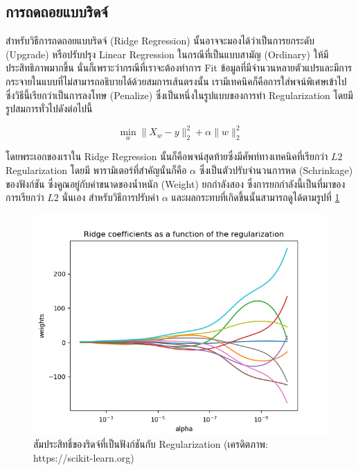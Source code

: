 \subsection{การถดถอยแบบริดจ์}
\label{ssec:ridge_reg}

สำหรับวิธีการถดถอยแบบริดจ์ (Ridge Regression) นั้นอาจจะมองได้ว่าเป็นการยกระดับ (Upgrade) หรือปรับปรุง Linear Regression 
ในกรณีที่เป็นแบบสามัญ (Ordinary) ให้มีประสิทธิภาพมากขึ้น นั่นก็เพราะว่ากรณีที่เราจะต้องทำการ Fit ข้อมูลที่มีจำนวนหลายตัวแปรและมีการ%
กระจายในแบบที่ไม่สามารถอธิบายได้ด้วยสมการเส้นตรงนั้น เรามีเทคนิคก็คือการใส่พจน์พิเศษเข้าไป ซึ่งวิธีนี้เรียกว่าเป็นการลงโทษ (Penalize) 
ซึ่งเป็นหนึ่งในรูปแบบของการทำ Regularization โดยมีรูปสมการทั่วไปดังต่อไปนี้

\begin{equation}
    \min_{w} \lVert X_{w} - y \rVert_{2}^{2} + \alpha \lVert w \rVert_{2}^{2}
\end{equation}

\noindent โดยพระเอกของเราใน Ridge Regression นั้นก็คือพจน์สุดท้ายซึ่งมีศัพท์ทางเทคนิคที่เรียกว่า $L2$ Regularization โดยมี%
พารามิเตอร์ที่สำคัญนั่นก็คือ $\alpha$ ซึ่งเป็นตัวปรับจำนวนการหด (Schrinkage) ของฟังก์ชัน ซึ่งคูณอยู่กับค่าขนาดของน้ำหนัก (Weight) 
ยกกำลังสอง ซึ่งการยกกำลังนี้เป็นที่มาของการเรียกว่า $L2$ นั่นเอง สำหรับวิธีการปรับค่า $\alpha$ และผลกระทบที่เกิดขึ้นนั้นสามารถดูได้ตามรูปที่ 
\ref{fig:ridge_res}

\begin{figure}[htbp]
    \centering
    \includegraphics[width=0.9\linewidth]{fig/plot_ridge_regression.png}
    \caption{สัมประสิทธิ์ของริดจ์ที่เป็นฟังก์ชันกับ Regularization (เครดิตภาพ: https://scikit-learn.org)}
    \label{fig:ridge_res}
\end{figure}

